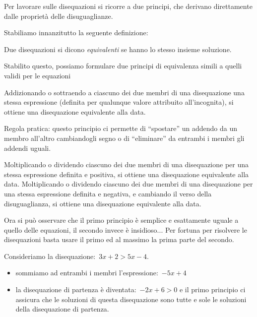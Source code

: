 Per lavorare sulle disequazioni si ricorre a due principi, che derivano 
direttamente dalle proprietà delle disuguaglianze.

Stabiliamo innanzitutto la seguente definizione:

\begin{definizione}
Due disequazioni si dicono \emph{equivalenti} se hanno lo
stesso insieme soluzione.
\end{definizione}

Stabilito questo, possiamo formulare due principi di equivalenza
simili a quelli validi per le equazioni

\begin{principio}[I principio]
\label{ppd}
Addizionando o sottraendo a ciascuno dei due membri di
una disequazione una stessa espressione (definita per qualunque
valore attribuito all'incognita), si ottiene una
disequazione equivalente alla data.
\end{principio}

Regola pratica: questo principio ci permette di
``spostare'' un addendo da un membro
all'altro cambiandogli segno o di
``eliminare'' da entrambi i membri
gli addendi uguali.

\begin{principio}[II principio]
Moltiplicando o dividendo ciascuno dei due membri di
una disequazione per una stessa espressione definita e positiva, 
si ottiene una disequazione equivalente alla data.
Moltiplicando o dividendo ciascuno dei due membri di
una disequazione per una stessa espressione definita e negativa, 
e cambiando il verso della disuguaglianza,
si ottiene una disequazione equivalente alla data.
\end{principio}

Ora si può osservare che il primo principio è semplice e esattamente uguale a 
quello delle equazioni, il secondo invece è insidioso... 
Per fortuna per risolvere le disequazioni basta usare il primo ed al massimo 
la prima parte del secondo.

\begin{exrig}
 \begin{esempio}
Consideriamo la disequazione:~$3x + 2 > 5 x -4$.
\begin{itemize}
 \item sommiamo ad entrambi i membri l'espressione:~$-5 x +4$ 
 \item la disequazione di partenza è diventata:~$-2 x +6 > 0$ e
  il primo principio ci assicura che le soluzioni di questa disequazione sono 
  tutte e sole le soluzioni della disequazione di partenza.
\end{itemize}
 \end{esempio}
\end{exrig}

